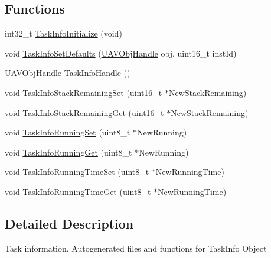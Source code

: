 \subsection*{\-Functions}
\begin{DoxyCompactItemize}
\item 
int32\-\_\-t \hyperlink{group___task_info_gadda50200d0ecf954c9fae650ace5a3d4}{\-Task\-Info\-Initialize} (void)
\item 
void \hyperlink{group___task_info_gab7176fb78f57b8367be3b806fbbadea7}{\-Task\-Info\-Set\-Defaults} (\hyperlink{targets_2_u_a_v_objects_2inc_2uavobjectmanager_8h_a279053e22be53ce9f895043aaeb91e3b}{\-U\-A\-V\-Obj\-Handle} obj, uint16\-\_\-t inst\-Id)
\item 
\hyperlink{targets_2_u_a_v_objects_2inc_2uavobjectmanager_8h_a279053e22be53ce9f895043aaeb91e3b}{\-U\-A\-V\-Obj\-Handle} \hyperlink{group___task_info_ga6959d93c526711bc6952becd5a2a7ae1}{\-Task\-Info\-Handle} ()
\item 
void \hyperlink{group___task_info_gaff9108117d1efba5ef5c922ffd8aac16}{\-Task\-Info\-Stack\-Remaining\-Set} (uint16\-\_\-t $\ast$\-New\-Stack\-Remaining)
\item 
void \hyperlink{group___task_info_ga6957401572fa1c2758f921f491365fed}{\-Task\-Info\-Stack\-Remaining\-Get} (uint16\-\_\-t $\ast$\-New\-Stack\-Remaining)
\item 
void \hyperlink{group___task_info_gac0d833659949dcdbf7ff42b228127264}{\-Task\-Info\-Running\-Set} (uint8\-\_\-t $\ast$\-New\-Running)
\item 
void \hyperlink{group___task_info_ga7ed2fc70604b7a7f7b8f7ddd39805434}{\-Task\-Info\-Running\-Get} (uint8\-\_\-t $\ast$\-New\-Running)
\item 
void \hyperlink{group___task_info_gab347b46b6978a1a99be17cdca7a8ecbe}{\-Task\-Info\-Running\-Time\-Set} (uint8\-\_\-t $\ast$\-New\-Running\-Time)
\item 
void \hyperlink{group___task_info_gaf28ceef999f68c6a790fe1f48cd35276}{\-Task\-Info\-Running\-Time\-Get} (uint8\-\_\-t $\ast$\-New\-Running\-Time)
\end{DoxyCompactItemize}


\subsection{\-Detailed \-Description}
\-Task information. \-Autogenerated files and functions for \-Task\-Info \-Object 

